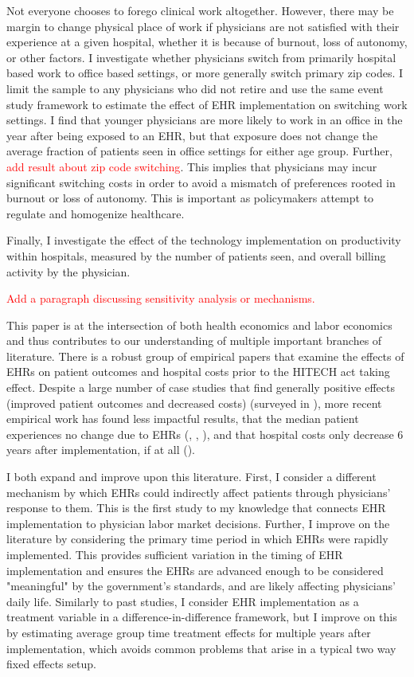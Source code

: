 \documentclass[11pt]{article}
\begin{document}
Not everyone chooses to forego clinical work altogether. However, there may be margin to change physical place of work if physicians are not satisfied with their experience at a given hospital, whether it is because of burnout, loss of autonomy, or other factors. I investigate whether physicians switch from primarily hospital based work to office based settings, or more generally switch primary zip codes. I limit the sample to any physicians who did not retire and use the same event study framework to estimate the effect of EHR implementation on switching work settings. I find that younger physicians are more likely to work in an office in the year after being exposed to an EHR, but that exposure does not change the average fraction of patients seen in office settings for either age group. Further, \textcolor{red}{add result about zip code switching}. This implies that physicians may incur significant switching costs in order to avoid a mismatch of preferences rooted in burnout or loss of autonomy. This is important as policymakers attempt to regulate and homogenize healthcare.

Finally, I investigate the effect of the technology implementation on productivity within hospitals, measured by the number of patients seen, and overall billing activity by the physician. 


\textcolor{red}{Add a paragraph discussing sensitivity analysis or mechanisms.}


This paper is at the intersection of both health economics and labor economics and thus contributes to our understanding of multiple important branches of literature. There is a robust group of empirical papers that examine the effects of EHRs on patient outcomes and hospital costs prior to the HITECH act taking effect. Despite a large number of case studies that find generally positive effects (improved patient outcomes and decreased costs) (surveyed in \cite{Buntin2011TheResults}), more recent empirical work has found less impactful results, that the median patient experiences no change due to EHRs (\cite{Agha2014TheCare}, \cite{McCullough2016HealthCoordination}, \cite{Meyerhoefer}), and that hospital costs only decrease 6 years after implementation, if at all (\cite{dranove2014trillion}). 

I both expand and improve upon this literature. First, I consider a different mechanism by which EHRs could indirectly affect patients through physicians' response to them. This is the first study to my knowledge that connects EHR implementation to physician labor market decisions. Further, I improve on the literature by considering the primary time period in which EHRs were rapidly implemented. This provides sufficient variation in the timing of EHR implementation and ensures the EHRs are advanced enough to be considered "meaningful" by the government's standards, and are likely affecting physicians' daily life. Similarly to past studies, I consider EHR implementation as a treatment variable in a difference-in-difference framework, but I improve on this by estimating average group time treatment effects for multiple years after implementation, which avoids common problems that arise in a typical two way fixed effects setup.  
\end{document}
